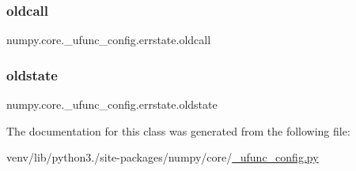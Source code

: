 \subsubsection{\texorpdfstring{oldcall}{oldcall}}
{\footnotesize\ttfamily numpy.\+core.\+\_\+ufunc\+\_\+config.\+errstate.\+oldcall}

\mbox{\label{classnumpy_1_1core_1_1__ufunc__config_1_1errstate_a08d963ccd4828cb523bb6b81b0c1a03d}} 
\subsubsection{\texorpdfstring{oldstate}{oldstate}}
{\footnotesize\ttfamily numpy.\+core.\+\_\+ufunc\+\_\+config.\+errstate.\+oldstate}



The documentation for this class was generated from the following file\+:\begin{DoxyCompactItemize}
\item 
venv/lib/python3./site-\/packages/numpy/core/\hyperlink{__ufunc__config_8py}{\+\_\+ufunc\+\_\+config.\+py}\end{DoxyCompactItemize}
